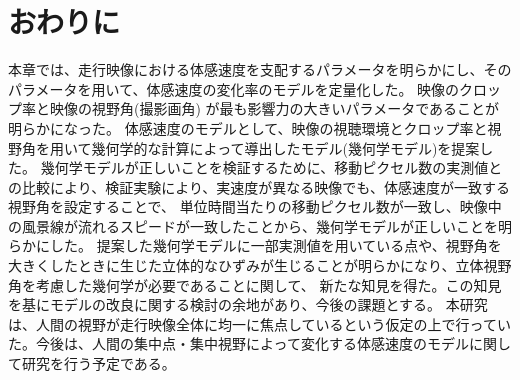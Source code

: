 \section{おわりに}
本章では、走行映像における体感速度を支配するパラメータを明らかにし、そのパラメータを用いて、体感速度の変化率のモデルを定量化した。
映像のクロップ率と映像の視野角(撮影画角) が最も影響力の大きいパラメータであることが明らかになった。
体感速度のモデルとして、映像の視聴環境とクロップ率と視野角を用いて幾何学的な計算によって導出したモデル(幾何学モデル)を提案した。
幾何学モデルが正しいことを検証するために、移動ピクセル数の実測値との比較により、検証実験により、実速度が異なる映像でも、体感速度が一致する視野角を設定することで、
単位時間当たりの移動ピクセル数が一致し、映像中の風景線が流れるスピードが一致したことから、幾何学モデルが正しいことを明らかにした。
提案した幾何学モデルに一部実測値を用いている点や、視野角を大きくしたときに生じた立体的なひずみが生じることが明らかになり、立体視野角を考慮した幾何学が必要であることに関して、
新たな知見を得た。この知見を基にモデルの改良に関する検討の余地があり、今後の課題とする。
本研究は、人間の視野が走行映像全体に均一に焦点しているという仮定の上で行っていた。今後は、人間の集中点・集中視野によって変化する体感速度のモデルに関して研究を行う予定である。
